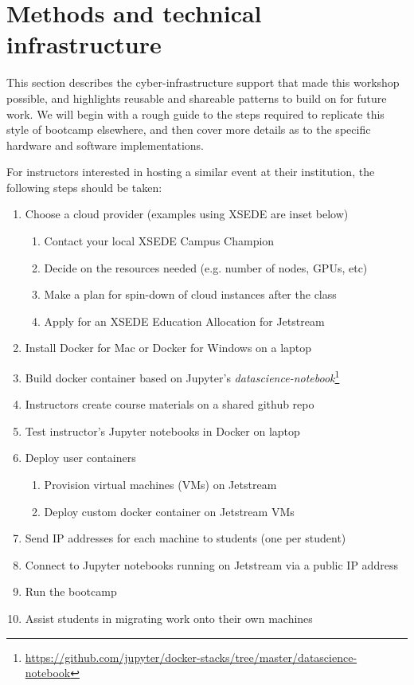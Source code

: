 \section{Methods and technical infrastructure}\label{sec:methods}

This section describes the cyber-infrastructure support that made this workshop possible, and
highlights reusable and shareable patterns to build on for future work. We will
begin with a rough guide to the steps required to replicate this style of
bootcamp elsewhere, and then cover more details as to the specific hardware and
software implementations.

For instructors interested in hosting a similar event at their institution, the
following steps should be taken:

\begin{enumerate}
\item Choose a cloud provider (examples using XSEDE are inset below)
  \begin{enumerate}
    \item Contact your local XSEDE Campus Champion
    \item Decide on the resources needed (e.g. number of nodes, GPUs, etc)
    \item Make a plan for spin-down of cloud instances after the class
    \item Apply for an XSEDE Education Allocation for Jetstream
  \end{enumerate}

\item Install Docker for Mac or Docker for Windows on a laptop
\item Build docker container based on Jupyter's \emph{datascience-notebook}\footnote{\url{https://github.com/jupyter/docker-stacks/tree/master/datascience-notebook}}
\item Instructors create course materials on a shared github repo
\item Test instructor's Jupyter notebooks in Docker on laptop
\item Deploy user containers
  \begin{enumerate}
  \item Provision virtual machines (VMs) on Jetstream
  \item Deploy custom docker container on Jetstream VMs
  \end{enumerate}
\item Send IP addresses for each machine to students (one per student)
\item Connect to Jupyter notebooks running on Jetstream via a public IP address
\item Run the bootcamp
\item Assist students in migrating work onto their own machines
\end{enumerate}

